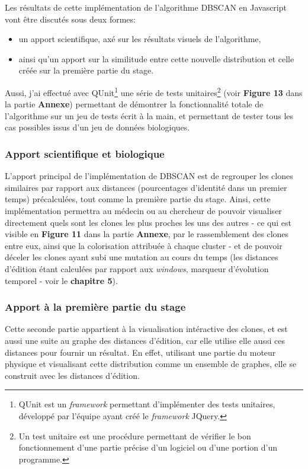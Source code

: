 \documentclass[12pt]{report}
\begin{document}
\begin{spacing}{1.2}
Les résultats de cette implémentation de l'algorithme DBSCAN en Javascript vont être discutés sous deux formes:
	\begin{itemize}
	\item{un apport scientifique, axé sur les résultats visuels de l'algorithme,}
	\item{ainsi qu'un apport sur la similitude entre cette nouvelle distribution et celle créée sur la première partie du stage.}
	\end{itemize}
Aussi, j'ai effectué avec QUnit\footnote{QUnit est un \textit{framework} permettant d'implémenter des tests unitaires, développé par l'équipe ayant créé le \textit{framework} JQuery.} une série de tests unitaires\footnote{Un test unitaire est une procédure permettant de vérifier le bon fonctionnement d'une partie précise d'un logiciel ou d'une portion d'un programme.} (voir \textbf{Figure 13} dans la partie \textbf{Annexe}) permettant de démontrer la fonctionnalité totale de l'algorithme sur un jeu de tests écrit à la main, et permettant de tester tous les cas possibles issus d'un jeu de données biologiques.

\subsubsection{Apport scientifique et biologique}

L'apport principal de l'implémentation de DBSCAN est de regrouper les clones similaires par rapport aux distances (pourcentages d'identité dans un premier temps) précalculées, tout comme la première partie du stage.
\newline
Ainsi, cette implémentation permettra au médecin ou au chercheur de pouvoir visualiser directement quels sont les clones les plus proches les uns des autres - ce qui est visible en \textbf{Figure 11} dans la partie \textbf{Annexe}, par le rassemblement des clones entre eux, ainsi que la colorisation attribuée à chaque cluster - et de pouvoir déceler les clones ayant subi une mutation au cours du temps (les distances d'édition étant calculées par rapport aux \textit{windows}, marqueur d'évolution temporel - voir le \textbf{chapitre 5}).

\subsubsection{Apport à la première partie du stage}

Cette seconde partie appartient à la visualisation intéractive des clones, et est aussi une suite au graphe des distances d'édition, car elle utilise elle aussi ces distances pour fournir un résultat.
\newline
En effet, utilisant une partie du moteur physique et visualisant cette distribution comme un ensemble de graphes, elle se construit avec les distances d'édition.


\end{spacing}
\end{document}
